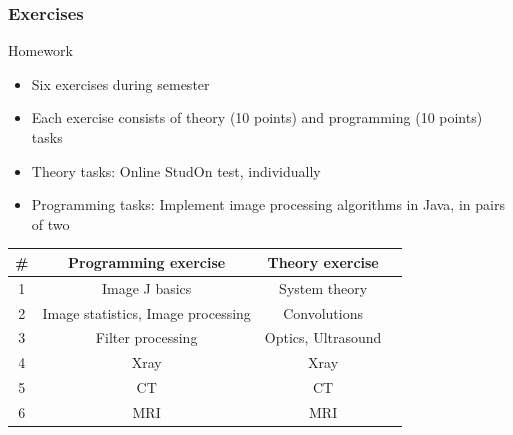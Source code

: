 \begin{frame}
	\frametitle{Exercises}
	\begin{block}{Homework}
		\begin{itemize}
			\item Six exercises during semester
			\item Each exercise consists of theory (10 points) and programming (10 points) tasks
			\item Theory tasks: Online StudOn test, individually
			\item Programming tasks: Implement image processing algorithms in Java, in pairs of two
		\end{itemize}
		\begin{center}
			\begin{tabular}{c | c | c | c}
				\# & Programming exercise			& Theory exercise \\ \hline
				1  & Image J basics    				& System theory              \\
				2  & Image statistics, Image processing    	& Convolutions                    \\
				3  & Filter processing  				& Optics, Ultrasound           \\
				4  & Xray    						& Xray                	      \\
				5  & CT    							& CT                		     \\
				6  & MRI    						& MRI                	     \\
			\end{tabular}
		\end{center}
	\end{block}
\end{frame}

